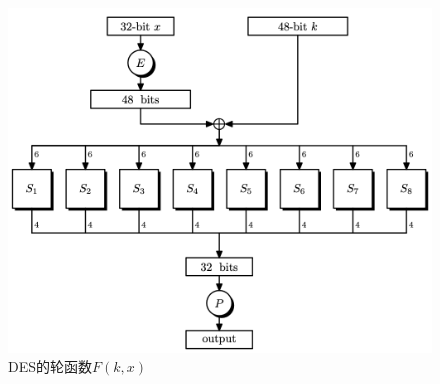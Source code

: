 \begin{figure}[p!]
  \centering
  \includegraphics[width=0.85\linewidth]{figures/chapter4/fig8.png}
  \caption{DES的轮函数$F(k,x)$}
  \label{fig:4-8}
\end{figure}

